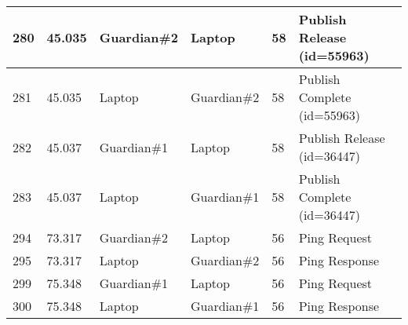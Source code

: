 \begin{table}[!ht]
\begin{tabular}{|l|l|l|l|l|l|}
        280 & 45.035 & Guardian\#2 & Laptop & 58 & Publish Release (id=55963) \\ \hline
        281 & 45.035 & Laptop & Guardian\#2 & 58 & Publish Complete (id=55963) \\ \hline
        282 & 45.037 & Guardian\#1 & Laptop & 58 & Publish Release (id=36447) \\ \hline
        283 & 45.037 & Laptop & Guardian\#1 & 58 & Publish Complete (id=36447) \\ \hline
        294 & 73.317 & Guardian\#2 & Laptop & 56 & Ping Request \\ \hline
        295 & 73.317 & Laptop & Guardian\#2 & 56 & Ping Response \\ \hline
        299 & 75.348 & Guardian\#1 & Laptop & 56 & Ping Request \\ \hline
        300 & 75.348 & Laptop & Guardian\#1 & 56 & Ping Response \\ \hline
    \end{tabular}
\end{table}